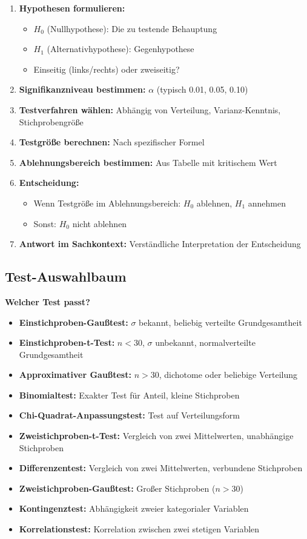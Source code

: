 \documentclass[12pt, a4paper, titlepage, ngerman]{scrartcl}
\begin{document}
\begin{enumerate}
  \item \textbf{Hypothesen formulieren:}
    \begin{itemize}
      \item $H_0$ (Nullhypothese): Die zu testende Behauptung
      \item $H_1$ (Alternativhypothese): Gegenhypothese
      \item Einseitig (links/rechts) oder zweiseitig?
    \end{itemize}
  \item \textbf{Signifikanzniveau bestimmen:} $\alpha$ (typisch 0.01, 0.05, 0.10)
  \item \textbf{Testverfahren wählen:} Abhängig von Verteilung, Varianz-Kenntnis, Stichprobengröße
  \item \textbf{Testgröße berechnen:} Nach spezifischer Formel
  \item \textbf{Ablehnungsbereich bestimmen:} Aus Tabelle mit kritischem Wert
  \item \textbf{Entscheidung:} 
    \begin{itemize}
      \item Wenn Testgröße im Ablehnungsbereich: $H_0$ ablehnen, $H_1$ annehmen
      \item Sonst: $H_0$ nicht ablehnen
    \end{itemize}
  \item \textbf{Antwort im Sachkontext:} Verständliche Interpretation der Entscheidung
\end{enumerate}

\subsection{Test-Auswahlbaum}

\textbf{Welcher Test passt?}

\begin{itemize}
  \item \textbf{Einstichproben-Gaußtest:} $\sigma$ bekannt, beliebig verteilte Grundgesamtheit
  \item \textbf{Einstichproben-t-Test:} $n < 30$, $\sigma$ unbekannt, normalverteilte Grundgesamtheit
  \item \textbf{Approximativer Gaußtest:} $n > 30$, dichotome oder beliebige Verteilung
  \item \textbf{Binomialtest:} Exakter Test für Anteil, kleine Stichproben
  \item \textbf{Chi-Quadrat-Anpassungstest:} Test auf Verteilungsform
  \item \textbf{Zweistichproben-t-Test:} Vergleich von zwei Mittelwerten, unabhängige Stichproben
  \item \textbf{Differenzentest:} Vergleich von zwei Mittelwerten, verbundene Stichproben
  \item \textbf{Zweistichproben-Gaußtest:} Großer Stichproben ($n > 30$)
  \item \textbf{Kontingenztest:} Abhängigkeit zweier kategorialer Variablen
  \item \textbf{Korrelationstest:} Korrelation zwischen zwei stetigen Variablen
\end{itemize}
\end{document}
